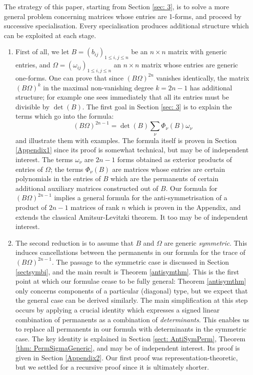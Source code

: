 \documentclass[10pt]{amsart}
\theoremstyle{plain}
\newcommand{\0}{\color{blue}{\mathsf{0}}}
\begin{document}
The strategy of this paper, starting from Section \ref{sec: 3},  is to solve a more  general problem concerning matrices whose entries are 1-forms,  and proceed by successive specialisation. Every specialisation produces additional structure which can be exploited at each stage. 
\begin{enumerate}
\item First of all, we let $B=(b_{ij})_{1\leq i, j\leq n}$ be an $n\times n$ matrix with generic entries, and $\Omega= (\omega_{ij})_{1\leq i, j\leq n}$  an $n\times n$ matrix whose entries are generic  one-forms. 
One can prove that since $(B \Omega)^{2n}$ vanishes identically, the matrix $(B \Omega)^{k}$ in the maximal non-vanishing degree $k=2n-1$ has additional structure; for example one sees immediately that all its entries must be divisible by $\det(B)$. 
The first goal in Section \ref{sec: 3} is to explain the terms which go into the  formula:
\[  (B \Omega)^{2n-1}  = \det(B) \sum_{\nu} \Phi_{\nu}(B) \omega_{\nu} \]
and illustrate  them with  examples. The formula itself is proven in Section \ref{Appendix1} since its proof is somewhat technical, but may be of independent interest.   The terms  $\omega_{\nu}$ are $2n-1$ forms obtained as exterior products of entries of $\Omega$; the terms $\Phi_{\nu}(B)$ are matrices whose entries are  certain polynomials in the entries of $B$ which are  the   permanents of certain additional auxiliary matrices constructed out of $B$.  Our formula for $(B\Omega)^{2n-1}$  implies a general formula for the anti-symmetrisation of a product of $2n-1$ matrices of rank $n$ which is proven in the Appendix, and extends the classical Amitsur-Levitzki theorem. It  too may  be of independent interest. 

     
     
\item The second reduction is to assume that $B$ and $\Omega$ are generic \emph{symmetric}. This induces cancellations between the permanents in our formula for the trace of $(B\Omega)^{2n-1}$.  The passage to the symmetric case is discussed in Section \ref{sectsymbi}, and the main result is Theorem \ref{antisymthm}. This is the first point at which our formulae cease to be fully general: Theorem \ref{antisymthm} only concerns components of a particular (diagonal) type, but we expect that the general case can be derived  similarly. 
The main simplification at this step occurs by  applying a crucial identity which expresses a signed linear combination of permanents as a combination of \emph{determinants}.  This enables us to replace all permanents in our formula with determinants in the symmetric case. The key identity is explained in Section \ref{sect: AntiSymPerm}, Theorem \ref{thm: PermSigmaGeneric}, and may be of independent interest. Its proof is given in Section \ref{Appendix2}. Our first proof was representation-theoretic, but we settled for a recursive proof since it is ultimately shorter. 



\end{enumerate}
\end{document}
